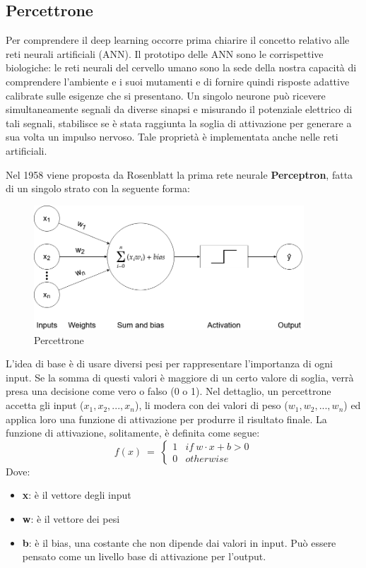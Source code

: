 \subsection{Percettrone}
Per comprendere il deep learning occorre prima chiarire il concetto relativo alle reti neurali artificiali (ANN). Il prototipo delle ANN sono le corrispettive biologiche: le reti neurali del cervello umano sono la sede della nostra capacità di comprendere l’ambiente e i suoi mutamenti e di fornire quindi risposte adattive calibrate sulle esigenze che si presentano. Un singolo neurone può ricevere simultaneamente segnali da diverse sinapsi e misurando il potenziale elettrico di tali segnali, stabilisce se è stata raggiunta la soglia di attivazione per generare a sua volta un impulso nervoso. Tale proprietà è implementata anche nelle reti artificiali.

Nel 1958 viene proposta da Rosenblatt la prima rete neurale \textbf{Perceptron}, fatta di un singolo strato con la seguente forma:

\begin{figure}[hbt!]
    \centering
    \includegraphics[width=0.9\textwidth]{img/perceptron.png}
    \caption{Percettrone}
    \label{fig:perceptron}
\end{figure}
L'idea di base è di usare diversi pesi per rappresentare l'importanza di ogni input. Se la somma di questi valori è maggiore di un certo valore di soglia, verrà presa una decisione come vero o falso (0 o 1). Nel dettaglio, un percettrone accetta gli input (\(x_1,x_2,...,x_n\)), li modera con dei valori di peso (\(w_1,w_2,...,w_n\)) ed applica loro una funzione di attivazione per produrre il risultato finale. 
La funzione di attivazione, solitamente, è definita come segue:
\begin{equation}
f(x) \ =\ \begin{cases}
        1 & if\ w\cdot x+b > 0\\
        0 & otherwise
    \end{cases}
\end{equation}
Dove:
\begin{itemize}
    \item \textbf{x}: è il vettore degli input
    \item \textbf{w}: è il vettore dei pesi
    \item \textbf{b}: è il bias, una costante che non dipende dai valori in input. Può essere pensato come un livello base di attivazione per l'output.
\end{itemize}

